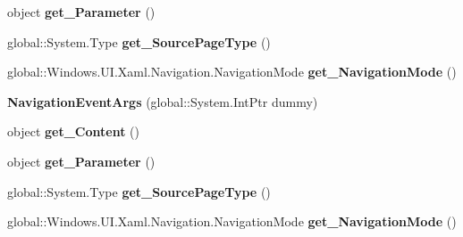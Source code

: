 \begin{DoxyCompactItemize}
object {\bfseries get\+\_\+\+Parameter} ()
\item 
\mbox{\label{class_windows_1_1_u_i_1_1_xaml_1_1_navigation_1_1_navigation_event_args_ac40ea82c6530db5f1c147e0d50f539d5}} 
global\+::\+System.\+Type {\bfseries get\+\_\+\+Source\+Page\+Type} ()
\item 
\mbox{\label{class_windows_1_1_u_i_1_1_xaml_1_1_navigation_1_1_navigation_event_args_a49b9eb754f028f3775a11aa7e9b33ecd}} 
global\+::\+Windows.\+U\+I.\+Xaml.\+Navigation.\+Navigation\+Mode {\bfseries get\+\_\+\+Navigation\+Mode} ()
\item 
\mbox{\label{class_windows_1_1_u_i_1_1_xaml_1_1_navigation_1_1_navigation_event_args_a78e228ec4fa7026f8047bfe00cd0eae8}} 
{\bfseries Navigation\+Event\+Args} (global\+::\+System.\+Int\+Ptr dummy)
\item 
\mbox{\label{class_windows_1_1_u_i_1_1_xaml_1_1_navigation_1_1_navigation_event_args_a08025ec2d6281a3208e53e79b28fe731}} 
object {\bfseries get\+\_\+\+Content} ()
\item 
\mbox{\label{class_windows_1_1_u_i_1_1_xaml_1_1_navigation_1_1_navigation_event_args_a390c547083328026c7cc65d9f4947c44}} 
object {\bfseries get\+\_\+\+Parameter} ()
\item 
\mbox{\label{class_windows_1_1_u_i_1_1_xaml_1_1_navigation_1_1_navigation_event_args_ac40ea82c6530db5f1c147e0d50f539d5}} 
global\+::\+System.\+Type {\bfseries get\+\_\+\+Source\+Page\+Type} ()
\item 
\mbox{\label{class_windows_1_1_u_i_1_1_xaml_1_1_navigation_1_1_navigation_event_args_a49b9eb754f028f3775a11aa7e9b33ecd}} 
global\+::\+Windows.\+U\+I.\+Xaml.\+Navigation.\+Navigation\+Mode {\bfseries get\+\_\+\+Navigation\+Mode} ()
\item 

\end{DoxyCompactItemize}
